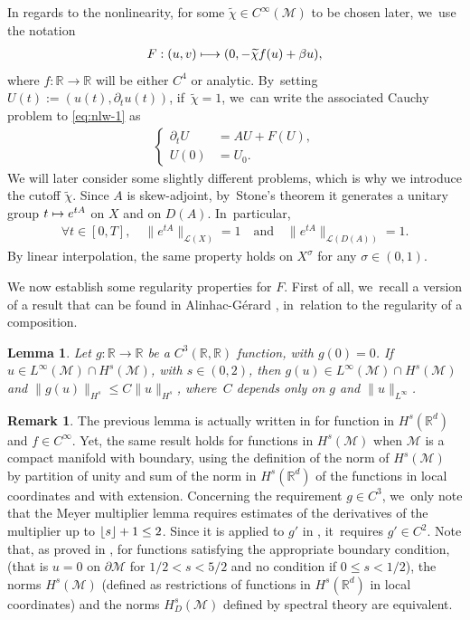 \documentclass[JEP,XML,SOM,Unicode,published]{cedram}
\newcommand{\quand}{\quad\text{and}\quad}
\newcommand\mto{\mathchoice{\longmapsto}{\mapsto}{\mapsto}{\mapsto}}
\DeclarePairedDelimiter\floor{\lfloor}{\rfloor}
\newtheorem{lemma}[theorem]{Lemma}
\theoremstyle{definition}
\newtheorem{remark}[theorem]{Remark}
\let\mc\mathcal
\newcommand{\M}{\mc{M}}
\newcommand{\R}{\mathbb{R}}
\providecommand{\norm}[1]{\lVert#1\rVert}
\begin{document}
In regards to the nonlinearity, for some $\widetilde{\chi}\in C^{\infty}(\M)$ to be chosen later, we~use the notation\vspace*{-3pt}
\begin{align}
\label{defFwave}
F: (u, v)\mto (0, -\widetilde{\chi} f(u)+\beta u),
\end{align}
where $f: \R \to \R$ will be either $C^4$ or analytic. By~setting $U(t):=(u(t), \partial_t u(t))$, if~$\widetilde{\chi}=1$, we~can write the associated Cauchy problem to \eqref{eq:nlw-1} as\vspace*{-3pt}
\begin{align}\label{eq:nlw-1-cauchy}
\left\{\begin{array}{rl}
\partial_t U&=AU+F(U), \\[3pt]
U(0)&=U_0.
\end{array}\right.
\end{align}
We will later consider some slightly different problems, which is why we introduce the cutoff $\widetilde{\chi}$. Since $A$ is skew-adjoint, by~Stone's theorem it generates a unitary group $t\mto e^{tA}$ on $X$ and on $D(A)$. In~particular,\vspace*{-3pt}
\begin{align*}
\forall t\in [0, T],\quad \norm{e^{tA}}_{\mc{L}(X)}= 1\quand\norm{e^{tA}}_{\mc{L}(D(A))}=1.
\end{align*}
By linear interpolation, the same property holds on $X^\sigma$ for any $\sigma\in (0, 1)$.

We now establish some regularity properties for $F$. First of all, we~recall a version of a result that can be found in Alinhac-Gérard \cite[Prop.\,2.2]{AG91}, in~relation to the regularity of a composition.
\begin{lemma}\label{lem:comp-reg}
Let $g: \R\to \R$ be a $C^3(\R, \R)$ function, with $g(0)=0$. If $u\in L^\infty(\M)\cap H^s(\M)$, with $s\in (0, 2)$, then $g(u)\in L^\infty(\M)\cap H^s(\M)$ and $\norm{g(u)}_{H^s}\leq C\norm{u}_{H^s}$, where~$C$ depends only on $g$ and $\norm{u}_{L^{\infty}}$.
\end{lemma}

\begin{remark}
The previous lemma is actually written in \cite{AG91} for function in $H^s(\R^d)$ and $f\in C^{\infty}$. Yet, the same result holds for functions in $H^s(\M)$ when $\M$ is a compact manifold with boundary, using the definition of the norm of $H^s(\M)$ by partition of unity and sum of the norm in $H^s(\R^d)$ of the functions in local coordinates and with extension. Concerning the requirement $g\in C^3$, we~only note that the Meyer multiplier lemma \cite[Lem.\,2.2.]{AG91} requires estimates of the derivatives of the multiplier up to $\floor{s}+1\leq 2$. Since it is applied to $g'$ in \cite[Prop.\,2.2]{AG91}, it~requires $g'\in C^2$. Note that, as proved in \cite{G:67}, for functions satisfying the appropriate boundary condition, (that is $u=0$ on $\partial \M$ for $1/2<s<5/2$ and no condition if $0\leq s<1/2$), the norms $H^s(\M)$ (defined as restrictions of functions in $H^s(\R^d)$ in local coordinates) and the norms $H^s_D(\M)$ defined by spectral theory are equivalent.
\end{remark}
\end{document}

